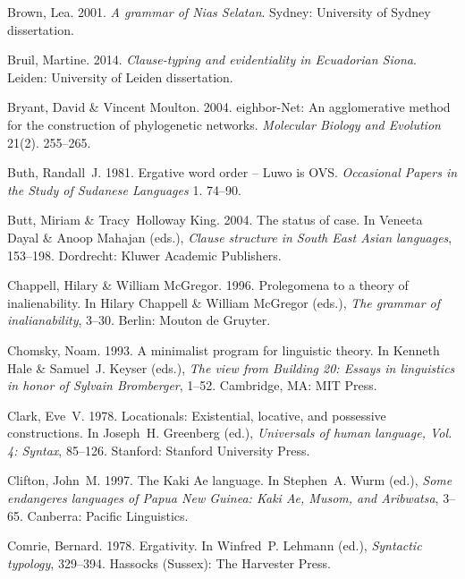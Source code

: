\documentclass[ number=1
			   ,series=sidl
				,url=http://langsci-press.org/catalog/book/18 
			   ,isbn=978-3-944675-19-0
			   ,output=long   %
			  ]{LSP/langsci}
\begin{document}
\begin{thebibliography}{190}
Brown, Lea. 2001.
\newblock \emph{A grammar of {N}ias {S}elatan}.
\newblock Sydney: University of Sydney dissertation.

Bruil, Martine. 2014.
\newblock \emph{Clause-typing and evidentiality in {E}cuadorian {S}iona}.
\newblock Leiden: University of Leiden dissertation.

Bryant, David \& Vincent Moulton. 2004.
eighbor-{N}et: {A}n agglomerative method for the construction of
  phylogenetic networks.
\newblock \emph{Molecular Biology and Evolution} 21(2). 255--265.

Buth, Randall~J. 1981.
\newblock Ergative word order -- {L}uwo is {OVS}.
\newblock \emph{Occasional Papers in the Study of Sudanese Languages} 1.
  74--90.

Butt, Miriam \& Tracy~Holloway King. 2004.
\newblock The status of case.
\newblock In Veneeta Dayal \& Anoop Mahajan (eds.), \emph{Clause structure in
  {S}outh {E}ast {A}sian languages}, 153--198. Dordrecht: Kluwer Academic
  Publishers.

Chappell, Hilary \& William McGregor. 1996.
\newblock Prolegomena to a theory of inalienability.
\newblock In Hilary Chappell \& William McGregor (eds.), \emph{The grammar of
  inalianability}, 3--30. Berlin: Mouton de Gruyter.

Chomsky, Noam. 1993.
\newblock A minimalist program for linguistic theory.
\newblock In Kenneth Hale \& Samuel~J. Keyser (eds.), \emph{The view from
  {B}uilding 20: {E}ssays in linguistics in honor of {S}ylvain {B}romberger},
  1--52. Cambridge, MA: MIT Press.

Clark, Eve~V. 1978.
\newblock Locationals: {E}xistential, locative, and possessive constructions.
\newblock In Joseph~H. Greenberg (ed.), \emph{Universals of human language,
  {V}ol. 4: {S}yntax}, 85--126. Stanford: Stanford University Press.

Clifton, John~M. 1997.
\newblock The {K}aki {A}e language.
\newblock In Stephen~A. Wurm (ed.), \emph{Some endangeres languages of {P}apua
  {N}ew {G}uinea: {K}aki {A}e, {M}usom, and {A}ribwatsa}, 3--65. Canberra:
  Pacific Linguistics.

Comrie, Bernard. 1978.
\newblock Ergativity.
\newblock In Winfred~P. Lehmann (ed.), \emph{Syntactic typology}, 329--394.
  Hassocks (Sussex): The Harvester Press.


\end{thebibliography}
\end{document}
